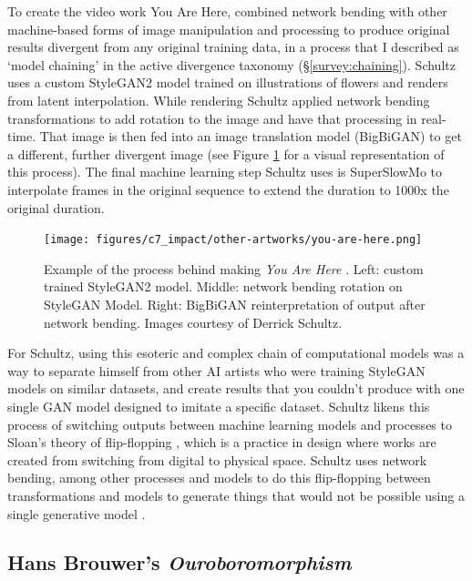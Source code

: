 To create the video work You Are Here, \citep{schutlz2020you} combined network bending with other machine-based forms of image manipulation and processing to produce original results divergent from any original training data, in a process that I described as `model chaining' in the active divergence taxonomy (\S \ref{survey:chaining}).
Schultz uses a custom StyleGAN2 model trained on illustrations of flowers and renders from latent interpolation. 
While rendering Schultz applied network bending transformations to add rotation to the image and have that processing in real-time. 
That image is then fed into an image translation model (BigBiGAN) \citep{donahue2019large} to get a different, further divergent image (see Figure \ref{fig:c7:you-are-here} for a visual representation of this process). 
The final machine learning step Schultz uses is SuperSlowMo \citep{jiang2018super} to interpolate frames in the original sequence to extend the duration to 1000x the original duration.

\begin{figure}[!htb]
    \centering
    \captionsetup{justification=centering}
    \texttt{[image: figures/c7\_impact/other-artworks/you-are-here.png]}
    \caption[Example of the process behind making \textit{You Are Here}]{Example of the process behind making \textit{You Are Here} \citep{schutlz2020you}. Left: custom trained StyleGAN2 model. Middle: network bending rotation on StyleGAN Model. Right: BigBiGAN reinterpretation of output after network bending. Images courtesy of Derrick Schultz.}
    \label{fig:c7:you-are-here}
\end{figure}

For Schultz, using this esoteric and complex chain of computational models was a way to separate himself from other AI artists who were training StyleGAN models on similar datasets, and create results that you couldn't produce with one single GAN model designed to imitate a specific dataset. 
Schultz likens this process of switching outputs between machine learning models and processes to Sloan's theory of flip-flopping \citeyearpar{sloan2012flipflop}, which is a practice in design where works are created from switching from digital to physical space. Schultz uses network bending, among other processes and models to do this flip-flopping between transformations and models to generate things that would not be possible using a single generative model \citep{schultz2021personal}.

\subsection{Hans Brouwer's \textit{Ouroboromorphism}}

